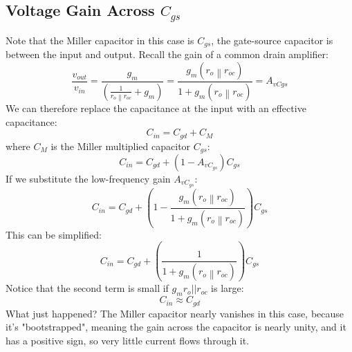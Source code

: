 \subsection{Voltage Gain Across \texorpdfstring{$C_{gs}$}{ the Gate-Source Capacitance}}
Note that the Miller capacitor in this case is $C_{gs}$, the gate-source capacitor is between the input and output.  Recall the gain of a common drain amplifier:
    \begin{equation}
        \frac{{{v_{out}}}}{{{v_{in}}}} = \frac{{{g_m}}}{{\left( {\frac{1}{{\left. {{r_o}} \right\|{r_{oc}}}} + {g_m}} \right)}} = \frac{{{g_m}(\left. {{r_o}} \right\|{r_{oc}})}}{{1 + {g_m}(\left. {{r_o}} \right\|{r_{oc}})}} = {A_{vCgs}}
    \end{equation}
We can therefore replace the capacitance at the input with an effective capacitance:
    \begin{equation} 
        {C_{in}} = {C_{gd}} + {C_M} 
    \end{equation}
where $C_M$ is the Miller multiplied capacitor $C_{gs}$:
    \begin{equation} 
        {C_{in}} = {C_{gd}} + (1 - {A_{v{C_{gs}}}}){C_{gs}} 
    \end{equation}
If we substitute the low-frequency gain $A_{v{C_{gs}}}$:
    \begin{equation} 
        {C_{in}} = {C_{gd}} + \left(1 - \frac{{{g_m}(\left. {{r_o}} \right\|{r_{oc}})}}{{1 + {g_m}(\left. {{r_o}} \right\|{r_{oc}})}} \right){C_{gs}}
    \end{equation}
This can be simplified:
    \begin{equation} 
        {C_{in}} = {C_{gd}} + \left(\frac{1}{{1 + {g_m}(\left. {{r_o}} \right\|{r_{oc}})}} \right){C_{gs}} 
    \end{equation}
Notice that the second term is small if $g_m r_o || r_{oc}$ is large:
    \begin{equation} 
        {C_{in}} \approx {C_{gd}} 
    \end{equation}
What just happened?  The Miller capacitor nearly vanishes in this case, because it's "bootstrapped", meaning the gain across the capacitor is nearly unity, and it has a positive sign, so very little current flows through it.
